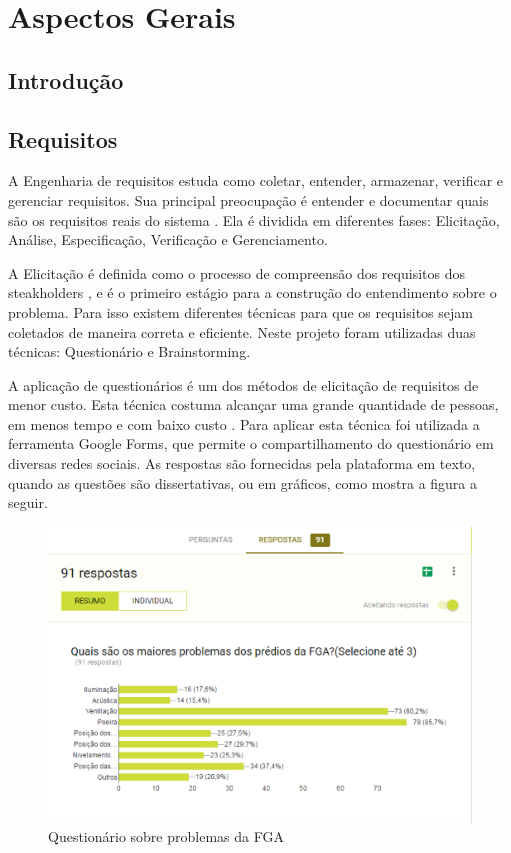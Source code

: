 \part{Aspectos Gerais}
\chapter[Introdução]{Introdução}

\chapter{Requisitos\label{ch:requisitos}}

A Engenharia de requisitos estuda como coletar, entender, armazenar, verificar e gerenciar requisitos. Sua principal preocupação é entender e documentar quais são os requisitos reais do sistema \cite{belgamo2000}. Ela é dividida em diferentes fases: Elicitação, Análise, Especificação, Verificação e Gerenciamento.

A Elicitação é definida como o processo de  compreensão dos requisitos dos steakholders \cite{yousuf2015}, e é o primeiro estágio para a construção do entendimento sobre o problema. Para isso existem diferentes técnicas para que os requisitos sejam coletados de maneira correta e eficiente. Neste projeto foram utilizadas duas técnicas:
Questionário e Brainstorming.

A aplicação de questionários é um dos métodos de elicitação de requisitos de menor custo. Esta técnica costuma alcançar uma grande quantidade de pessoas, em menos  tempo e com baixo custo \cite{gunda2008}. Para aplicar esta técnica foi utilizada a ferramenta Google Forms, que permite o compartilhamento do questionário em diversas redes sociais. As respostas são fornecidas pela plataforma em texto, quando as questões são dissertativas, ou em gráficos, como mostra a figura a seguir.

\begin{figure}[h]
  \caption{Questionário sobre problemas da FGA}
  \centering
    \includegraphics[width=1.0\textwidth]{figuras/pesq.eps}
\end{figure}

